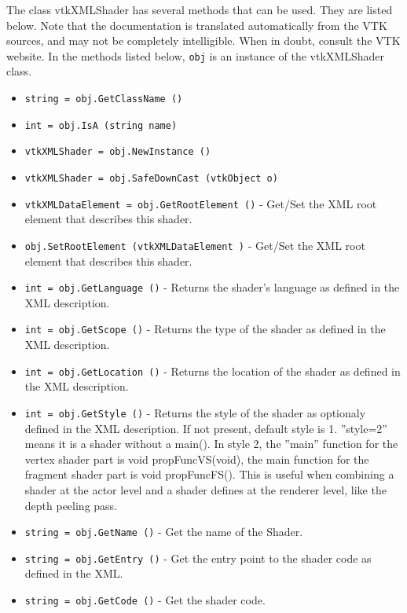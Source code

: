 The class vtkXMLShader has several methods that can be used.
  They are listed below.
Note that the documentation is translated automatically from the VTK sources,
and may not be completely intelligible.  When in doubt, consult the VTK website.
In the methods listed below, \verb|obj| is an instance of the vtkXMLShader class.
\begin{itemize}
\item  \verb|string = obj.GetClassName ()|

\item  \verb|int = obj.IsA (string name)|

\item  \verb|vtkXMLShader = obj.NewInstance ()|

\item  \verb|vtkXMLShader = obj.SafeDownCast (vtkObject o)|

\item  \verb|vtkXMLDataElement = obj.GetRootElement ()| -  Get/Set the XML root element that describes this shader.

\item  \verb|obj.SetRootElement (vtkXMLDataElement )| -  Get/Set the XML root element that describes this shader.

\item  \verb|int = obj.GetLanguage ()| -  Returns the shader's language as defined in the XML description.

\item  \verb|int = obj.GetScope ()| -  Returns the type of the shader as defined in the XML description.

\item  \verb|int = obj.GetLocation ()| -  Returns the location of the shader as defined in the XML description.

\item  \verb|int = obj.GetStyle ()| -  Returns the style of the shader as optionaly defined in the XML
 description. If not present, default style is 1. ''style=2'' means it is
 a shader without a main(). In style 2, the ''main'' function for the vertex
 shader part is void propFuncVS(void), the main function for the fragment
 shader part is void propFuncFS(). This is useful when combining a shader
 at the actor level and a shader defines at the renderer level, like
 the depth peeling pass.
 

\item  \verb|string = obj.GetName ()| -  Get the name of the Shader.

\item  \verb|string = obj.GetEntry ()| -  Get the entry point to the shader code as defined in the XML.

\item  \verb|string = obj.GetCode ()| -  Get the shader code.

\end{itemize}
